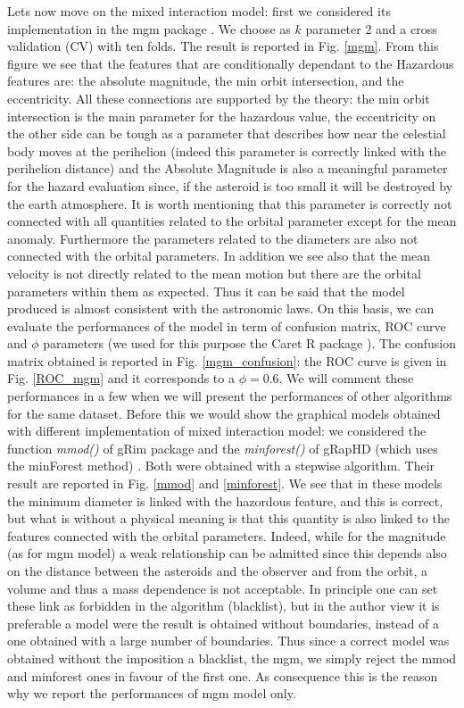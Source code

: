 \documentclass[12pt,%
               a4paper,%
               oneside,openany,%
               titlepage,%
               headinclude,footinclude,%
               BCOR5mm,%
               cleardoublepage=empty,%
               tablecaptionabove,%
               floatperchapter,
               ]{scrreprt}                 %
\begin{document}
Lets now move on the mixed interaction model: first we considered its implementation in the mgm package \cite{mgm,haslbeck2015mgm}. We choose as $k$ parameter 2 and a cross validation (CV) with ten folds. The result is reported in Fig. \ref{mgm}. From this figure we see that the features that are conditionally dependant to the Hazardous features are: the absolute magnitude, the min orbit intersection, and the eccentricity.  All these connections are supported by the theory: the min orbit intersection is the main parameter for the hazardous value, the eccentricity on the other side can be tough as a parameter that describes how near the celestial body moves at the perihelion (indeed this parameter is correctly linked with the perihelion distance) and the Absolute Magnitude is also a meaningful parameter for the hazard evaluation since, if the asteroid is too small it will be destroyed by the earth atmosphere. It is worth mentioning that this parameter is correctly not connected with all quantities related to the orbital parameter except for the mean anomaly. Furthermore the parameters related to the diameters are also not connected with the orbital parameters. In addition we see also that the mean velocity is not directly related to the mean motion but there are the orbital parameters within them as expected. Thus it can be said that the model produced is almost consistent with the astronomic laws. On this basis, we can evaluate the performances of the model in term of confusion matrix, ROC curve and $\phi$ parameters (we used for this purpose the Caret R package \cite{kuhn2008building,caret}). The confusion matrix obtained is reported in Fig. \ref{mgm_confusion}: the ROC curve is given in Fig. \ref{ROC_mgm} and it corresponds to a $\phi=0.6$. We will comment these performances in a few when we will present the performances of other algorithms for the same dataset. Before this we would show the graphical models obtained with different implementation of mixed interaction model: we considered the function \textit{mmod()} of gRim package \cite{hojsgaard2012graphical} and the \textit{minforest()} of gRapHD (which uses the minForest method) \cite{de2009high}. Both were obtained with a stepwise algorithm.  Their result are reported in Fig. \ref{mmod} and \ref{minforest}. We see that in these models the minimum diameter is linked with the hazordous feature, and this is correct, but what is without a physical meaning is that this quantity is also linked to the features connected with the orbital parameters. Indeed, while for the magnitude (as for mgm model) a weak relationship can be admitted since this depends also on the distance between the asteroids and the observer and from the orbit, a volume and thus a mass dependence is not acceptable. In principle one can set these link as forbidden in the algorithm (blacklist), but in the author view it is preferable a model were the result is obtained without boundaries, instead of a one obtained with a large number of boundaries. Thus since a correct model was obtained without the imposition a blacklist, the mgm, we simply reject the mmod and minforest ones in favour of the first one. As consequence this is the reason why we report the performances of mgm model only. 
\end{document}
